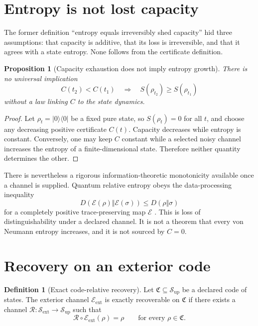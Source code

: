 \documentclass[11pt,a4paper]{article}
\numberwithin{equation}{section}
\newtheorem{proposition}[theorem]{Proposition}
\theoremstyle{definition}
\newtheorem{definition}[theorem]{Definition}
\theoremstyle{remark}
\newcommand{\cE}{\mathcal E}
\newcommand{\cR}{\mathcal R}
\newcommand{\cS}{\mathcal S}
\begin{document}
\section{Entropy is not lost capacity}

The former definition ``entropy equals irreversibly shed capacity'' hid
three assumptions: that capacity is additive, that its loss is
irreversible, and that it agrees with a state entropy.  None follows from
the certificate definition.

\begin{proposition}[Capacity exhaustion does not imply entropy growth]
\label{prop:noentropy}
There is no universal implication
\[
  C(t_2)<C(t_1)
  \quad\Longrightarrow\quad
  S(\rho_{t_2})\geq S(\rho_{t_1})
\]
without a law linking \(C\) to the state dynamics.
\end{proposition}

\begin{proof}
Let \(\rho_t=\lvert0\rangle\langle0\rvert\) be a fixed pure state, so
\(S(\rho_t)=0\) for all \(t\), and choose any decreasing positive
certificate \(C(t)\).  Capacity decreases while entropy is constant.
Conversely, one may keep \(C\) constant while a selected noisy channel
increases the entropy of a finite-dimensional state.  Therefore neither
quantity determines the other.
\end{proof}

There is nevertheless a rigorous information-theoretic monotonicity
available once a channel is supplied.  Quantum relative entropy obeys
the data-processing inequality
\[
  D(\cE(\rho)\Vert\cE(\sigma))
  \leq
  D(\rho\Vert\sigma)
\]
for a completely positive trace-preserving map \(\cE\)
\cite{Lindblad1975,Petz1986}.  This is loss of distinguishability under a
declared channel.  It is not a theorem that every von Neumann entropy
increases, and it is not sourced by \(C=0\).

\section{Recovery on an exterior code}
\label{sec:recovery}

\begin{definition}[Exact code-relative recovery]
Let \(\mathfrak C\subseteq\cS_{\mathrm{up}}\) be a declared code of
states.  The exterior channel \(\cE_{\mathrm{ext}}\) is exactly
recoverable on \(\mathfrak C\) if there exists a channel
\(\cR:\cS_{\mathrm{ext}}\to\cS_{\mathrm{up}}\) such that
\[
  \cR\circ\cE_{\mathrm{ext}}(\rho)=\rho
  \qquad
  \text{for every }\rho\in\mathfrak C.
\]
\end{definition}
\end{document}
